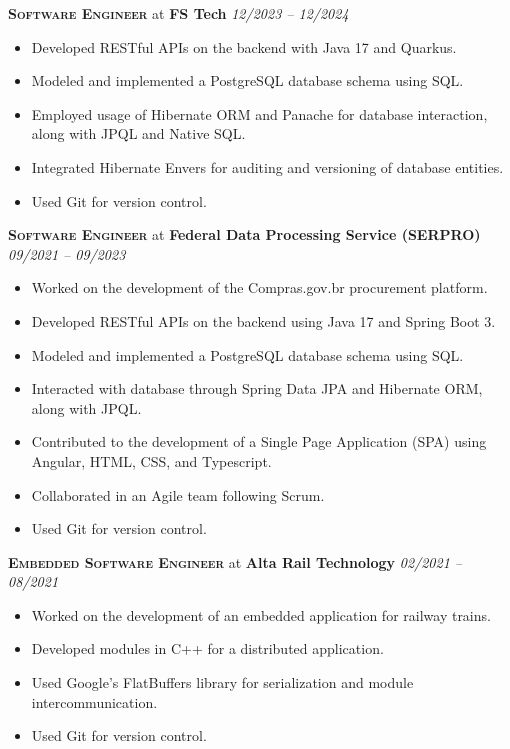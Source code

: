 \documentclass[a4paper,12pt]{article}
\begin{document}
\textbf{\textsc{Software Engineer}} at \textbf{FS Tech} \hfill \textit{12/2023 -- 12/2024}

{\small
\begin{itemize}[leftmargin=*,label=\large\textbullet]
    \setlength\itemsep{-0.2em}
    \item Developed RESTful APIs on the backend with Java 17 and Quarkus.
    \item Modeled and implemented a PostgreSQL database schema using SQL.
    \item Employed usage of Hibernate ORM and Panache for database interaction, along with JPQL and Native SQL.
    \item Integrated Hibernate Envers for auditing and versioning of database entities.
    \item Used Git for version control.
\end{itemize}
}

\textbf{\textsc{Software Engineer}} at \textbf{Federal Data Processing Service (SERPRO)} \hfill \textit{09/2021 -- 09/2023}

{\small
\begin{itemize}[leftmargin=*,label=\large\textbullet]
    \setlength\itemsep{-0.2em}
    \item Worked on the development of the Compras.gov.br procurement platform.
    \item Developed RESTful APIs on the backend using Java 17 and Spring Boot 3.
    \item Modeled and implemented a PostgreSQL database schema using SQL.
    \item Interacted with database through Spring Data JPA and Hibernate ORM, along with JPQL.
    \item Contributed to the development of a Single Page Application (SPA) using Angular, HTML, CSS, and Typescript.
    \item Collaborated in an Agile team following Scrum.
    \item Used Git for version control.
\end{itemize}
}

\textbf{\textsc{Embedded Software Engineer}} at \textbf{Alta Rail Technology} \hfill \textit{02/2021 -- 08/2021}

{\small
\begin{itemize}[leftmargin=*,label=\large\textbullet]
    \setlength\itemsep{-0.2em}
    \item Worked on the development of an embedded application for railway trains.
    \item Developed modules in C++ for a distributed application.
    \item Used Google's FlatBuffers library for serialization and module intercommunication.
    \item Used Git for version control.
\end{itemize}
}
\end{document}
